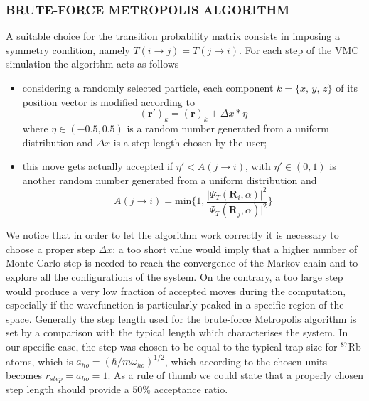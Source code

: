 \subsubsection{BRUTE-FORCE METROPOLIS ALGORITHM}
A suitable choice for the transition probability matrix consists in imposing a symmetry condition, namely $T( i\rightarrow j) = T(j \rightarrow i)$. For each step of the VMC simulation the algorithm acts as follows
\begin{itemize}
    \item considering a randomly selected particle, each  component $k = \{x,\,y,\,z\}$ of its position vector is modified according to
    \begin{equation*}
        (\bm{r}')_k = (\bm{r})_k + \Delta x \ast \eta
    \end{equation*}
    where $\eta \in (-0.5, 0.5)$ is a random number generated from a uniform distribution and $\Delta x$ is a step length chosen by the user;
    \item this move gets actually accepted if $\eta' < A(j\rightarrow i)$, with $\eta' \in (0,1)$ is another random number generated from a uniform distribution and
    \begin{equation}
        A(j \rightarrow i) = \text{min} \bigg\{ 1, \frac{\vert \Psi_T(\bm{R}_i, \alpha) \vert^2 }{\vert \Psi_T(\bm{R}_j, \alpha) \vert^2 } \bigg\}
        \label{acceptance_metropolis}
    \end{equation}
\end{itemize}
We notice that in order to let the algorithm work correctly it is necessary to choose a proper step $\Delta x$: a too short value would imply that a higher number of Monte Carlo step is needed to reach the convergence of the Markov chain and to explore all the configurations of the system. On the contrary, a too large step would produce a very low fraction of accepted moves during the computation, especially if the wavefunction is particularly peaked in a specific region of the space. Generally the step length used for the brute-force Metropolis algorithm \cite{metropolis} is set by a comparison with the typical length which characterises the system. In our specific case, the step was chosen to be equal to the typical trap size for $^{87}$Rb atoms, which is $a_{ho}=(\hbar/m\omega_{ho})^{1/2}$, which according to the chosen units becomes $r_{step}=a_{ho}=1$. As a rule of thumb we could state that a properly chosen step length should provide a $50\%$ acceptance ratio.




